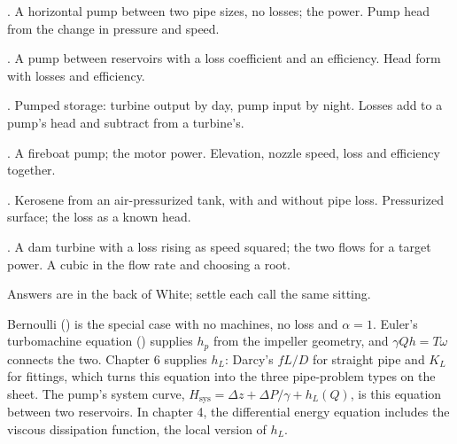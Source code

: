 \begin{ladder}
\item {}. A horizontal pump between two pipe sizes, no losses; the power. Pump head from the change in pressure and speed.
\item {}. A pump between reservoirs with a loss coefficient and an efficiency. Head form with losses and efficiency.
\item {}. Pumped storage: turbine output by day, pump input by night. Losses add to a pump's head and subtract from a turbine's.
\item {}. A fireboat pump; the motor power. Elevation, nozzle speed, loss and efficiency together.
\item {}. Kerosene from an air-pressurized tank, with and without pipe loss. Pressurized surface; the loss as a known head.
\item {}. A dam turbine with a loss rising as speed squared; the two flows for a target power. A cubic in the flow rate and choosing a root.
\end{ladder}
Answers are in the back of White; settle each call the same sitting.


\begin{hides}
Bernoulli () is the special case with no machines, no loss and $\alpha = 1$. Euler's turbomachine equation () supplies $h_p$ from the impeller geometry, and $\gamma Qh = T\omega$ connects the two. Chapter 6 supplies $h_L$: Darcy's $fL/D$ for straight pipe and $K_L$ for fittings, which turns this equation into the three pipe-problem types on the sheet. The pump's system curve, $H_\text{sys} = \Delta z + \Delta P/\gamma + h_L(Q)$, is this equation between two reservoirs. In chapter 4, the differential energy equation includes the viscous dissipation function, the local version of $h_L$.
\end{hides}
